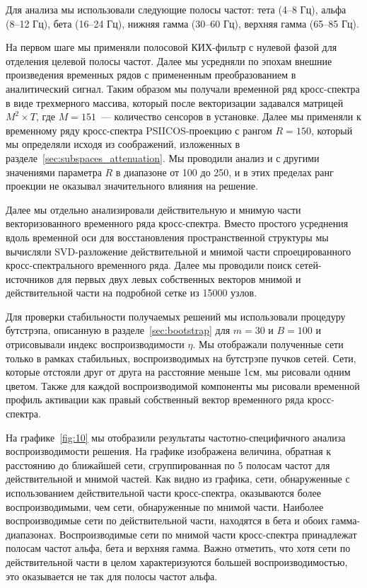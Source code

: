 Для анализа мы использовали следующие полосы частот: тета (4--8 Гц), альфа
(8--12 Гц), бета (16--24 Гц), нижняя гамма (30--60 Гц), верхняя гамма (65--85
Гц).

На первом шаге мы применяли полосовой КИХ-фильтр с нулевой фазой для отделения
целевой полосы частот. Далее мы усредняли по эпохам внешние произведения
временных рядов с примененным преобразованием в аналитический сигнал. Таким
образом мы получали временной ряд кросс-спектра в виде трехмерного массива,
который после векторизации задавался матрицей $M^2 \times T$, где $M=151$~---
количество сенсоров в установке. Далее мы применяли к временному ряду
кросс-спектра PSIICOS-проекцию с рангом $R=150$, который мы определяли исходя
из соображений, изложенных в разделе~\ref{sec:subspaces_attenuation}. Мы
проводили анализ и с другими значениями параметра $R$ в диапазоне от 100 до
250, и в этих пределах ранг проекции не оказывал значительного влияния на
решение.

Далее мы отдельно анализировали действительную и мнимую части векторизованного
временного ряда кросс-спектра. Вместо простого усреднения вдоль временной оси
для восстановления пространственной структуры мы вычисляли SVD-разложение
действительной и мнимой части спроецированного кросс-спектрального временного
ряда. Далее мы проводили поиск сетей-источников для первых двух левых
собственных векторов мнимой и действительной части на подробной сетке из 15000
узлов.

Для проверки стабильности получаемых решений мы использовали процедуру
бутстрэпа, описанную в разделе~\ref{sec:bootstrap} для $m=30$ и $B=100$ и
отрисовывали индекс воспроизводимости $\eta$.  Мы отображали полученные сети
только в рамках стабильных, воспроизводимых на бутстрэпе пучков сетей. Сети,
которые отстояли друг от друга на расстояние меньше 1см, мы рисовали одним
цветом.  Также для каждой воспроизводимой компоненты мы рисовали временной
профиль активации как правый собственный вектор временного ряда кросс-спектра.




На графике~\ref{fig:10} мы отобразили результаты частотно-специфичного
анализа воспроизводимости решения. На графике изображена величина, обратная к
расстоянию до ближайшей сети, сгруппированная по 5 полосам частот для
действительной и мнимой частей. Как видно из графика, сети, обнаруженные с
использованием действительной части кросс-спектра, оказываются более
воспроизводимыми, чем сети, обнаруженные по мнимой части. Наиболее воспроизводимые
сети по действительной части, находятся в бета и обоих гамма-диапазонах.
Воспроизводимые сети по мнимой части кросс-спектра принадлежат полосам частот
альфа, бета и верхняя гамма. Важно отметить, что хотя сети по действительной части
в целом характеризуются большей воспроизводимостью, это оказывается не так для
полосы частот альфа.

